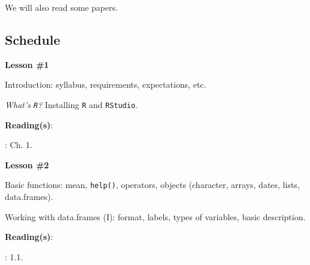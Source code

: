 \documentclass[letterpaper]{article}
\renewenvironment{itemize}{
  \begin{list}{}{
    \setlength{\leftmargin}{1.5em}
  }
}{
  \end{list}
}
\begin{document}
\begin{itemize}
\item[{\color{red}\Pointinghand}] We will also read some papers.
\end{itemize}


\subsection*{Schedule}


\begin{enumerate}
	\item {}

			\begin{itemize} 
				\item[$\bullet$] {\bf Lesson \#1}
				\begin{itemize} 
					\item[$\circ$] Introduction: syllabus, requirements, expectations, etc.
					\item[$\circ$] \emph{What's \texttt{R}?} Installing \texttt{R} and \texttt{RStudio}.
					\item[$\circ$] {\bf Reading(s)}: 
						\begin{itemize} 
							\item[$\diamond$] \textcite{Wooldridge2010}: Ch. 1.
									\end{itemize}
				\end{itemize}
			\end{itemize}






			\begin{itemize} 
				\item[$\bullet$] {\bf Lesson \#2}
				\begin{itemize} 
					\item[$\circ$] Basic functions: mean, \texttt{help()}, operators, objects (character, arrays, dates, lists, data.frames).
					\item[$\circ$] Working with data.frames (I): format, labels, types of variables, basic description. %
					\item[$\circ$] {\bf Reading(s)}: 
					\begin{itemize}
						\item[$\diamond$] \textcite{Fox:2010vc}: 1.1.
					\end{itemize}
				\end{itemize}
			\end{itemize}





\end{enumerate}
\end{document}
